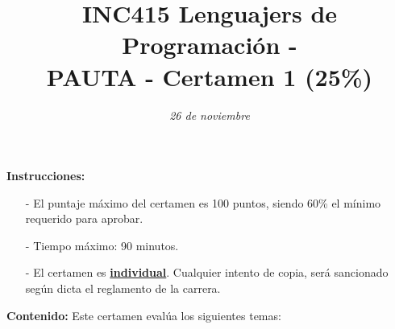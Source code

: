 \documentclass{exam}
\title{\LARGE\color{azul}\textbf{INC415 Lenguajers de Programaci\'on - \\ PAUTA - Certamen 1 (25\%)}}
\author{\normalsize \color{gray}{Prof.} \color{black}{\textbf{Rodrigo Olivares}}}
\date{\normalsize \em 26 de noviembre}
\begin{document}

\maketitle

\vspace*{-7mm}
\noindent
\textbf{Instrucciones:} 
\begin{itemize}
    \item[-] El puntaje m\'aximo del certamen es 100 puntos, siendo 60\% el m\'inimo requerido para aprobar.
    \item[-] Tiempo m\'aximo: 90 minutos.
    \item[-] El certamen es \underline{\textbf{individual}}. Cualquier intento de copia, ser\'a sancionado seg\'un dicta el reglamento de la carrera.
\end{itemize}


\noindent
\textbf{Contenido:} Este certamen eval\'ua los siguientes temas:
\end{document}
